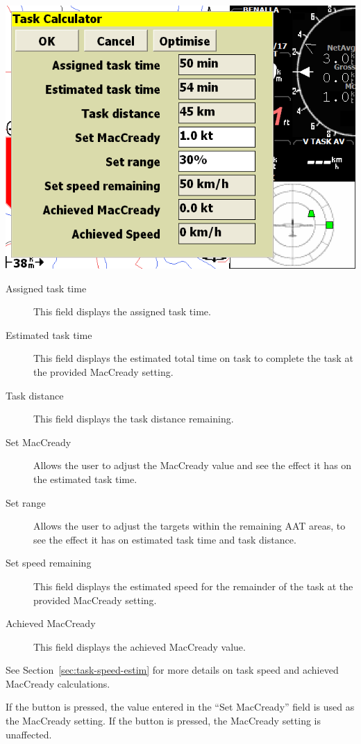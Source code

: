 \documentclass[a4paper,12pt]{refrep}
\begin{document}
\begin{center}
\includegraphics[angle=0,width=\linewidth,keepaspectratio='true']{figures/dialog-taskcalc3.png}
\end{center}

\begin{description}
\item[Assigned task time]  This field displays the assigned task time.
\item[Estimated task time]  This field displays the estimated total time 
 on task to complete the task at the provided MacCready setting.
\item[Task distance]  This field displays the task distance remaining.
\item[Set MacCready]  Allows the user to adjust the MacCready value and 
 see the effect it has on the estimated task time.
\item[Set range]  Allows the user to adjust the targets within the remaining 
 AAT areas, to see the effect it has on estimated task time and task distance.
\item[Set speed remaining]  This field displays the estimated speed for the
 remainder of the task at the provided MacCready setting.
\item[Achieved MacCready]  This field displays the achieved MacCready value.
\end{description}
See Section~\ref{sec:task-speed-estim} for more details on task speed
and achieved MacCready calculations.

If the  button is pressed, the value entered in the ``Set
MacCready'' field is used as the MacCready setting.  If the
 button is pressed, the MacCready setting is
unaffected.
\end{document}
